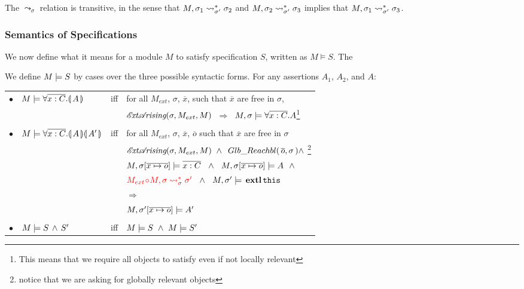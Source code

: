  
{ The $\leadsto_{\sigma}$ relation is transitive, in the sense that $M, \sigma_1 \leadsto^*_{\sigma'} \sigma_2$ and $M, \sigma_2 \leadsto^*_{\sigma'} \sigma_3$ implies that $M, \sigma_1 \leadsto^*_{\sigma'} \sigma_3$.}
 
 \subsubsection{ Semantics of \SpecLang Specifications}
We now  define what it means for  a module  $M$ to satisfy specification  $S$, written as $M \vDash S$. The
 
\begin{definition}%

We define $M \models {S}$ by cases over the three possible syntactic forms.
For any assertions   $A_1$, $A_2$, and $A$: \\

\label{def:necessity-semantics}

\begin{tabular}{l l c l }

$\bullet$ & $M \models \forall {\overline {x:C}}.{\llparenthesis}\, A \,{\rrparenthesis} 	$& iff & 
for all $M_{ext}$, $\sigma$, $\overline{x}$, such that $\overline{x}$  are free in $\sigma$, \\
  & & & $ {\mathcal{E}\!\textit{xt}\mathcal{A}\!\textit{rising}(\sigma, M_{ext}, M)}$ %
$ \ \Longrightarrow \  $  %
{$ M , \sigma \models \forall \overline{x:C}.A$}\footnote{{This means that we require all objects to satisfy even if not locally relevant}}
\\
\\
$\bullet$ & $M \models \forall {\overline {x:C}}.{\llparenthesis}\, A \,{\rrparenthesis}{\llparenthesis}\, A' \,{\rrparenthesis}$& iff & 
for all $M_{ext}$, $\sigma$, $\overline{x}$, $\overline{o}$ such that $\overline{x}$  are free in $\sigma$  \\
& & &
${\extArising{\sigma}{M_{ext}}{M}} \ \wedge\  \GRelevant {\overline o}  \sigma \wedge \ $\footnote{{notice that we are asking for globally relevant objects}}\\
& & & $ \satisfiesA{M}{\sigma[\overline{x\mapsto o}]}{\overline {x:C}}  \ \ \wedge\ \  \satisfiesA{M}{\sigma[\overline{x\mapsto o}]}{A} \ \ \wedge$ \\ 
& & &
$\color{red}M_{ext}\!\circ \!M, \sigma \leadsto^*_{\sigma} \sigma'  \color{black} \ \ \wedge\ \  M, \sigma' \models {{\ensuremath{\, \mathbf{extl}}\, {\texttt{this}}\, }}$ \\
& & & $ \Longrightarrow $ \\
& & & $ M , \sigma'[\overline{x\mapsto o}] \models A' $
\\
\\
$\bullet$ &  $M \models S\, \wedge\, S'$ &   iff   & $\satisfies{M}{S}\ \wedge \ \satisfies{M}{S'}$
\end{tabular} 

 
\end{definition} 


